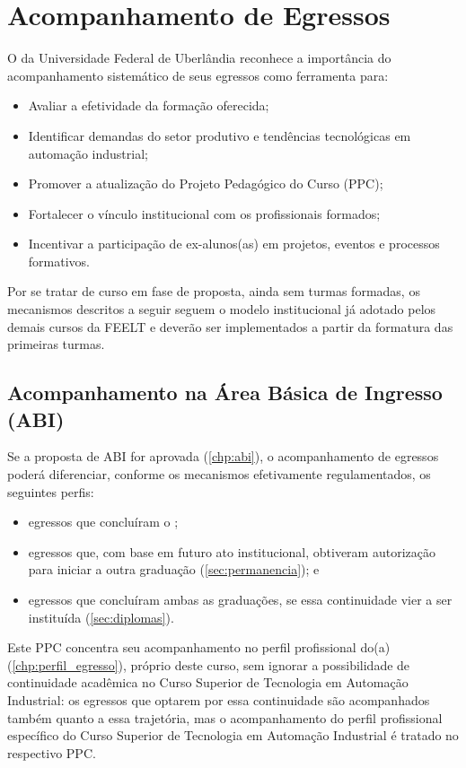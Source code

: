 \chapter{Acompanhamento de Egressos}
\label{chp:acompanhamento_egresso}

O \ppccurso da Universidade Federal de Uberlândia reconhece a importância do acompanhamento sistemático de seus egressos como ferramenta para:

\begin{itemize}
    \item Avaliar a efetividade da formação oferecida;
    \item Identificar demandas do setor produtivo e tendências tecnológicas em automação industrial;
    \item Promover a atualização do Projeto Pedagógico do Curso (PPC);
    \item Fortalecer o vínculo institucional com os profissionais formados;
    \item Incentivar a participação de ex-alunos(as) em projetos, eventos e processos formativos.
\end{itemize}

Por se tratar de curso em fase de proposta, ainda sem turmas formadas, os mecanismos descritos a seguir seguem o modelo institucional já adotado pelos demais cursos da FEELT e deverão ser implementados a partir da formatura das primeiras turmas.

\section{Acompanhamento na Área Básica de Ingresso (ABI)}

Se a proposta de ABI for aprovada (\autoref{chp:abi}), o acompanhamento de egressos poderá diferenciar, conforme os mecanismos efetivamente regulamentados, os seguintes perfis:

\begin{itemize}
    \item egressos que concluíram o \ppccurso;
    \item egressos que, com base em futuro ato institucional, obtiveram autorização para iniciar a outra graduação (\autoref{sec:permanencia}); e
    \item egressos que concluíram ambas as graduações, se essa continuidade vier a ser instituída (\autoref{sec:diplomas}).
\end{itemize}

Este PPC concentra seu acompanhamento no perfil profissional do(a) \ppctitulacao (\autoref{chp:perfil_egresso}), próprio deste curso, sem ignorar a possibilidade de continuidade acadêmica no Curso Superior de Tecnologia em Automação Industrial: os egressos que optarem por essa continuidade são acompanhados também quanto a essa trajetória, mas o acompanhamento do perfil profissional específico do Curso Superior de Tecnologia em Automação Industrial é tratado no respectivo PPC.


